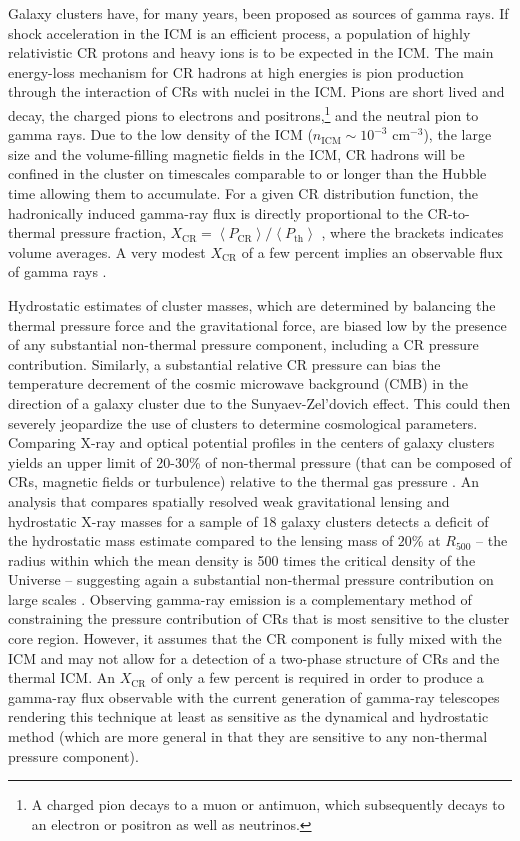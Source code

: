\documentclass[12pt,manuscript]{aastex}
\newcommand{\expval}[1]{\left\langle #1 \right\rangle}
\newcommand{\CR}{\mathrm{CR}}
\begin{document}
Galaxy clusters have, for many years, been proposed as sources of gamma rays. If shock acceleration
in the ICM is an efficient process, a population of highly relativistic CR protons and heavy ions is
to be expected in the ICM. The main energy-loss mechanism for CR hadrons at high energies is pion
production through the interaction of CRs with nuclei in the ICM. Pions are short lived and decay,
the charged pions to electrons and positrons,\footnote{A charged pion decays to a muon or antimuon,
which subsequently decays to an electron or positron as well as neutrinos.} and the neutral pion to
gamma rays. Due to the low density of the ICM ($n_{\mathrm{ICM}}\sim 10^{-3}$ cm$^{-3}$), the large
size and the volume-filling magnetic fields in the ICM, CR hadrons will be confined in
the cluster on timescales comparable to or longer than the Hubble time
\citep[][]{article:Volk_etal:1996, article:Berezinsky_etal:1997} allowing them to accumulate. For a
given CR distribution function, the hadronically induced gamma-ray flux is directly proportional to
the CR-to-thermal pressure fraction, $X_\CR=\expval{P_{\CR}}/ \expval{P_{\mathrm{th}}}$
\citep[see, e.g.,][]{article:Ensslin_etal:2007}, where the brackets indicates volume averages. A
very modest $X_{\CR}$ of a few percent implies an observable flux of gamma rays
\citep[e.g.,][]{article:PfrommerEnsslin:2004b}.

Hydrostatic estimates of cluster masses, which are determined by balancing the thermal pressure
force and the gravitational force, are biased low by the presence of any substantial non-thermal
pressure component, including a CR pressure contribution. Similarly, a substantial relative CR
pressure can bias the temperature decrement of the cosmic microwave background (CMB) in the
direction of a galaxy cluster due to the Sunyaev-Zel'dovich effect. This could then severely
jeopardize the use of clusters to determine cosmological parameters. Comparing X-ray and optical
potential profiles in the centers of galaxy clusters yields an upper limit of 20-30\% of non-thermal
pressure (that can be composed of CRs, magnetic fields or turbulence) relative to the thermal gas
pressure \citep{article:Churazov_etal:2008, article:Churazov_etal:2010}. An analysis that compares
spatially resolved weak gravitational lensing and hydrostatic X-ray masses for a sample of 18 galaxy
clusters detects a deficit of the hydrostatic mass estimate compared to the lensing mass of $20\%$
at $R_{500}$ -- the radius within which the mean density is 500 times the critical density of the
Universe -- suggesting again a substantial non-thermal pressure contribution on large scales
\citep{article:Mahdavi_etal:2008}. Observing gamma-ray emission is a complementary method of
constraining the pressure contribution of CRs that is most sensitive to the cluster core
region. However, it assumes that the CR component is fully mixed with the ICM and may not allow for
a detection of a two-phase structure of CRs and the thermal ICM. An $X_\CR$ of only a few percent is
required in order to produce a gamma-ray flux observable with the current generation of gamma-ray
telescopes rendering this technique at least as sensitive as the dynamical and hydrostatic method
(which are more general in that they are sensitive to any non-thermal pressure component).
\end{document}
